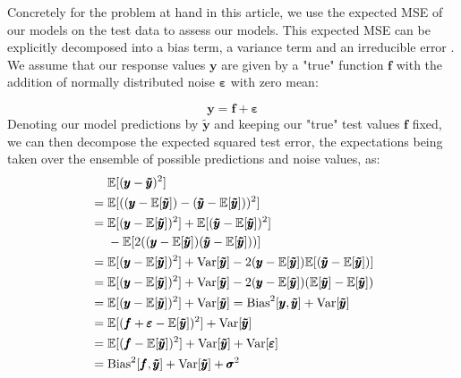 \documentclass[reprint, english, nofootinbib]{revtex4-2}
\begin{document}
        Concretely for the problem at hand in this article, we use the expected MSE of our models on the test data to assess our models. This expected MSE can be explicitly decomposed into a bias term, a variance term and an irreducible error \cite{hastie}. We assume that our  response values $\pmb{y}$ are given by a "true" function $\pmb{f}$ with the addition of normally distributed noise $\pmb{\varepsilon}$ with zero mean:

        \begin{equation}
        \label{model_assumption}
        \pmb{y} = \pmb{f} + \pmb{\varepsilon}
        \end{equation}
            Denoting our model predictions by $\pmb{\tilde{y}}$ and keeping our "true" test values $\pmb{f}$ fixed,  we can then decompose the expected squared test error, the expectations being taken over the ensemble of possible predictions and noise values, as:
        \begin{align}
        \label{bias_variance_decomp}
        \begin{split}
        & \quad\,\, \mathbb{E} [(\pmb{y} - \pmb{\tilde{y}})^2]
        \\
        &= \mathbb{E} [((\pmb{y} - \mathbb{E}[\pmb{\tilde{y}}]) - (\pmb{\tilde{y}} - \mathbb{E}[\pmb{\tilde{y}}]))^2]
        \\
        &= \mathbb{E}[(\pmb{y} - \mathbb{E}[\pmb{\tilde{y}}])^2] + \mathbb{E}[(\pmb{\tilde{y}} - \mathbb{E}[\pmb{\tilde{y}}])^2]
        \\
        &\quad\,\,- \mathbb{E} [ 2 ( (\pmb{y} - \mathbb{E}[\pmb{\tilde{y}}])(\pmb{\tilde{y}} - \mathbb{E}[\pmb{\tilde{y}}]))]
        \\
        &= \mathbb{E}[(\pmb{y} - \mathbb{E}[\pmb{\tilde{y}}])^2] + \textup{Var}[\pmb{\tilde{y}}] - 2(\pmb{y} - \mathbb{E}[\pmb{\tilde{y}}])\mathbb{E}[(\pmb{\tilde{y}} - \mathbb{E}[\pmb{\tilde{y}}])]
        \\
        &= \mathbb{E}[(\pmb{y} - \mathbb{E}[\pmb{\tilde{y}}])^2] + \textup{Var}[\pmb{\tilde{y}}] - 2(\pmb{y} - \mathbb{E}[\pmb{\tilde{y}}])(\mathbb{E}[\pmb{\tilde{y}}] - \mathbb{E}[\pmb{\tilde{y}}])
        \\
        &= \mathbb{E}[(\pmb{y} - \mathbb{E}[\pmb{\tilde{y}}])^2] + \textup{Var}[\pmb{\tilde{y}}] = \textup{Bias}^2[\pmb{y},\pmb{\tilde{y}}] + \textup{Var}[\pmb{\tilde{y}}]
        \\
        &= \mathbb{E}[(\pmb{f} + \pmb{\varepsilon} - \mathbb{E}[\pmb{\tilde{y}}])^2] + \textup{Var}[\pmb{\tilde{y}}]
        \\
        &= \mathbb{E}[(\pmb{f} - \mathbb{E}[\pmb{\tilde{y}}])^2] + \textup{Var}[\pmb{\tilde{y}}] + \textup{Var}[\pmb{\varepsilon}]
        \\
        &= \textup{Bias}^2[\pmb{f},\pmb{\tilde{y}}] + \textup{Var}[\pmb{\tilde{y}}] + \pmb{\sigma}^2
        \end{split}
        \end{align}
\end{document}
